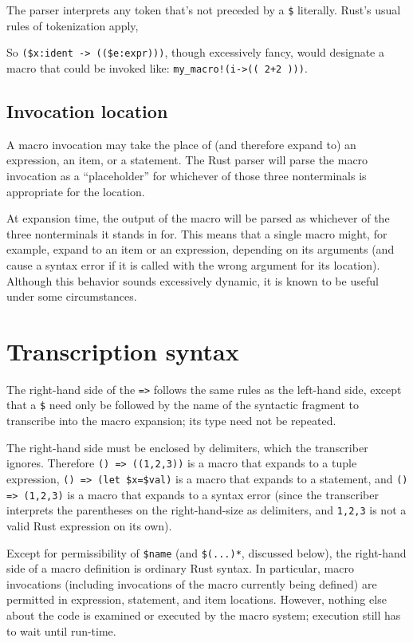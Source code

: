 \documentclass[]{article}
\begin{document}
The parser interprets any token that's not preceded by a \texttt{\$}
literally. Rust's usual rules of tokenization apply,

So \texttt{(\$x:ident -\textgreater{} ((\$e:expr)))}, though excessively
fancy, would designate a macro that could be invoked like:
\texttt{my\_macro!(i-\textgreater{}(( 2+2 )))}.

\subsection{Invocation location}\label{invocation-location}

A macro invocation may take the place of (and therefore expand to) an
expression, an item, or a statement. The Rust parser will parse the
macro invocation as a ``placeholder'' for whichever of those three
nonterminals is appropriate for the location.

At expansion time, the output of the macro will be parsed as whichever
of the three nonterminals it stands in for. This means that a single
macro might, for example, expand to an item or an expression, depending
on its arguments (and cause a syntax error if it is called with the
wrong argument for its location). Although this behavior sounds
excessively dynamic, it is known to be useful under some circumstances.

\section{Transcription syntax}\label{transcription-syntax}

The right-hand side of the \texttt{=\textgreater{}} follows the same
rules as the left-hand side, except that a \texttt{\$} need only be
followed by the name of the syntactic fragment to transcribe into the
macro expansion; its type need not be repeated.

The right-hand side must be enclosed by delimiters, which the
transcriber ignores. Therefore \texttt{() =\textgreater{} ((1,2,3))} is
a macro that expands to a tuple expression,
\texttt{() =\textgreater{} (let \$x=\$val)} is a macro that expands to a
statement, and \texttt{() =\textgreater{} (1,2,3)} is a macro that
expands to a syntax error (since the transcriber interprets the
parentheses on the right-hand-size as delimiters, and \texttt{1,2,3} is
not a valid Rust expression on its own).

Except for permissibility of \texttt{\$name} (and \texttt{\$(...)*},
discussed below), the right-hand side of a macro definition is ordinary
Rust syntax. In particular, macro invocations (including invocations of
the macro currently being defined) are permitted in expression,
statement, and item locations. However, nothing else about the code is
examined or executed by the macro system; execution still has to wait
until run-time.
\end{document}
